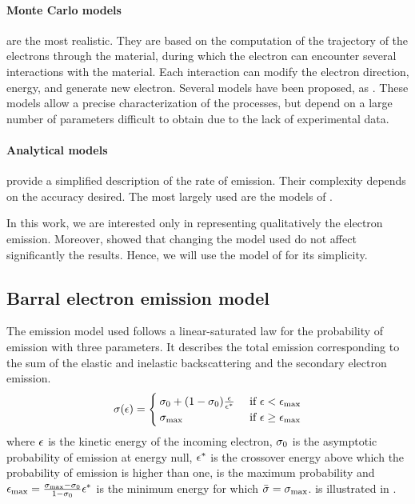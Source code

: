 \paragraph{Monte Carlo models} are the most realistic.
 They are based on the computation of the trajectory of the electrons through the material, during which the electron can encounter several interactions with the material.
 Each interaction can modify the electron direction, energy, and generate new electron.
 Several models have been proposed, as \citet{furman2002,pierron2017}.
 These models allow a precise characterization of the processes, but depend on a large number of parameters difficult to obtain due to the lack of experimental data.
 
\paragraph{Analytical models} provide a simplified description of the rate of emission.
Their complexity depends on the accuracy desired.
The most largely used are the models of \citet{vaughan1989,barral2003a,sydorenko2006b}.

In this work, we are interested only in representing qualitatively the electron emission.
Moreover, \citet{croes2017} showed that changing the model used do not affect significantly the results. 
Hence, we will use the model of \citet{barral2003a} for its simplicity.

\subsection{Barral electron emission model}
\label{sec-modelused}

The emission model used follows a linear-saturated law for the probability of emission with three parameters. 
It describes the total emission corresponding to the sum of the elastic and inelastic backscattering and the secondary electron emission.
\begin{equation} \label{eq-proba_barral}
  \sigma (\epsilon) = 
  \begin{cases}
    \sigma _0 + (1 - \sigma _0) \frac{\epsilon}{\epsilon^{*}}   &\text{ if } \epsilon <  \epsilon_{\max} \\
    \sigma _{\rm max}  &\text{ if } \epsilon \geq \epsilon_{\max}
  \end{cases}
\end{equation}
where $\epsilon$ is the kinetic energy of the incoming electron, $\sigma _0$ is the asymptotic probability of emission at energy null, $\epsilon^{*}$ is the crossover energy above which the probability of emission is higher than one, \probamax is the maximum probability and $\epsilon_{\max}= \frac{\sigma _{\rm max}  - \sigma _0}{1 - \sigma _0} \epsilon^{*} $ is the minimum energy for which $ \bar{\sigma } = \sigma _{\rm max} $.
 is illustrated in .


